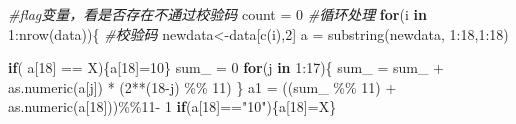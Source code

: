 \documentclass[
]{article}
\newenvironment{Shaded}{\begin{snugshade}}{\end{snugshade}}
\newcommand{\CommentTok}[1]{\textcolor[rgb]{0.56,0.35,0.01}{\textit{#1}}}
\newcommand{\ControlFlowTok}[1]{\textcolor[rgb]{0.13,0.29,0.53}{\textbf{#1}}}
\newcommand{\DecValTok}[1]{\textcolor[rgb]{0.00,0.00,0.81}{#1}}
\newcommand{\FunctionTok}[1]{\textcolor[rgb]{0.00,0.00,0.00}{#1}}
\newcommand{\NormalTok}[1]{#1}
\newcommand{\OtherTok}[1]{\textcolor[rgb]{0.56,0.35,0.01}{#1}}
\newcommand{\SpecialCharTok}[1]{\textcolor[rgb]{0.00,0.00,0.00}{#1}}
\newcommand{\StringTok}[1]{\textcolor[rgb]{0.31,0.60,0.02}{#1}}
\begin{document}
\begin{Shaded}
\begin{Highlighting}[]
\CommentTok{\#flag变量，看是否存在不通过校验码}
\NormalTok{count }\OtherTok{=} \DecValTok{0}
\CommentTok{\#循环处理}
\ControlFlowTok{for}\NormalTok{(i }\ControlFlowTok{in} \DecValTok{1}\SpecialCharTok{:}\FunctionTok{nrow}\NormalTok{(data))\{}
\CommentTok{\#校验码}
\NormalTok{  newdata}\OtherTok{\textless{}{-}}\NormalTok{data[}\FunctionTok{c}\NormalTok{(i),}\DecValTok{2}\NormalTok{]}
\NormalTok{  a }\OtherTok{=} \FunctionTok{substring}\NormalTok{(newdata, }\DecValTok{1}\SpecialCharTok{:}\DecValTok{18}\NormalTok{,}\DecValTok{1}\SpecialCharTok{:}\DecValTok{18}\NormalTok{)}

  \ControlFlowTok{if}\NormalTok{( a[}\DecValTok{18}\NormalTok{] }\SpecialCharTok{==} \StringTok{\textquotesingle{}X\textquotesingle{}}\NormalTok{)\{a[}\DecValTok{18}\NormalTok{]}\OtherTok{=}\DecValTok{10}\NormalTok{\}}
\NormalTok{    sum\_ }\OtherTok{=} \DecValTok{0}
    \ControlFlowTok{for}\NormalTok{(j }\ControlFlowTok{in} \DecValTok{1}\SpecialCharTok{:}\DecValTok{17}\NormalTok{)\{}
\NormalTok{    sum\_ }\OtherTok{=}\NormalTok{ sum\_ }\SpecialCharTok{+}  \FunctionTok{as.numeric}\NormalTok{(a[j]) }\SpecialCharTok{*}\NormalTok{ (}\DecValTok{2}\SpecialCharTok{**}\NormalTok{(}\DecValTok{18}\SpecialCharTok{{-}}\NormalTok{j) }\SpecialCharTok{\%\%} \DecValTok{11}\NormalTok{)}
\NormalTok{    \}}
\NormalTok{    a1 }\OtherTok{=}\NormalTok{ ((sum\_ }\SpecialCharTok{\%\%} \DecValTok{11}\NormalTok{) }\SpecialCharTok{+} \FunctionTok{as.numeric}\NormalTok{(a[}\DecValTok{18}\NormalTok{]))}\SpecialCharTok{\%\%}\DecValTok{11}\SpecialCharTok{{-}} \DecValTok{1}
  \ControlFlowTok{if}\NormalTok{(a[}\DecValTok{18}\NormalTok{]}\SpecialCharTok{==}\StringTok{"10"}\NormalTok{)\{a[}\DecValTok{18}\NormalTok{]}\OtherTok{=}\StringTok{\textquotesingle{}X\textquotesingle{}}\NormalTok{\}}
  

\end{Highlighting}
\end{Shaded}
\end{document}
